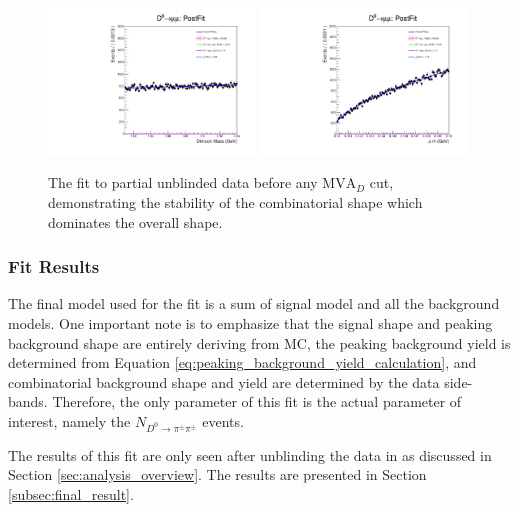 \begin{figure}[htp]
    \begin{center}
      \includegraphics[width=0.49\textwidth]{figures/chapter4/signal_fit/partial_fit_m.pdf}
      \includegraphics[width=0.49\textwidth]{figures/chapter4/signal_fit/partial_fit_dm.pdf}\\
    \end{center}
    \caption{
      The fit to partial unblinded data before any $\text{MVA}_D$ cut, demonstrating the stability of the combinatorial shape which dominates the overall shape.
    }
    \label{fig:signal_comb_uml_fit}
\end{figure}

\subsubsection{Fit Results}

The final model used for the fit is a sum of signal model and all the background models. One important note is to emphasize that the signal shape and peaking background shape are entirely deriving from MC, the peaking background yield is determined from Equation \ref{eq:peaking_background_yield_calculation}, and combinatorial background shape and yield are determined by the data side-bands. Therefore, the only parameter of this fit is the actual parameter of interest, namely the $N_{D^0 \to \pi^\pm \pi^\pm}$ events. 

The results of this fit are only seen after unblinding the data in as discussed in Section \ref{sec:analysis_overview}. The results are presented in Section \ref{subsec:final_result}.

